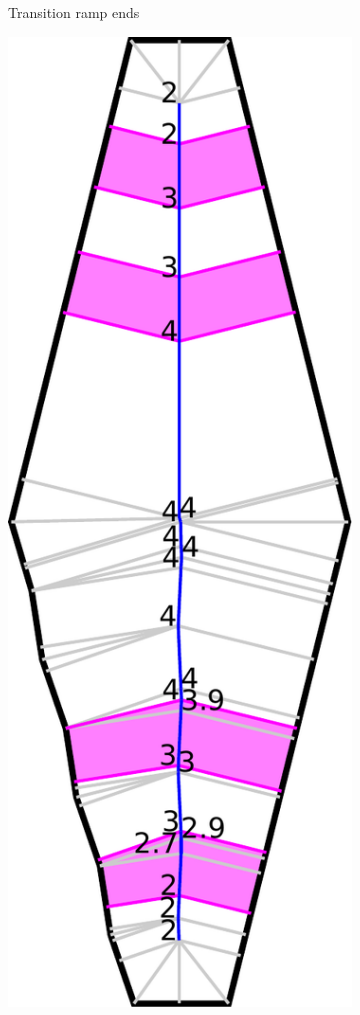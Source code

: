 \begin{figure}
\begin{subfigure}{\figwidth}
\caption{Transition ramp ends}\label{beading_transitioning_filtering__transition_ends}
\end{subfigure}
\begin{subfigure}{\figwidth}
\includegraphics[width=\columnwidth]{sources-method-beading-transitioning-filtering--transitions-applied.pdf}

\end{subfigure}
\end{figure}
